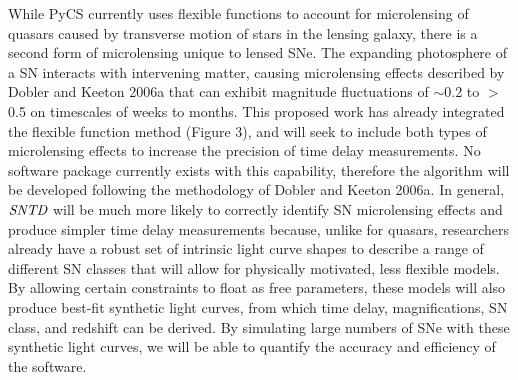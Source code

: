 While PyCS currently uses flexible functions to account for microlensing of quasars caused by transverse motion of stars in the lensing galaxy, there is a second form of microlensing unique to lensed SNe. The expanding photosphere of a SN interacts with intervening matter, causing microlensing effects described by Dobler and Keeton 2006a that can exhibit magnitude fluctuations of $\sim$0.2 to $>$0.5 on timescales of weeks to months. This proposed work has already integrated the flexible function method (Figure 3), and will seek to include both types of microlensing effects to increase the precision of time delay measurements. No software package currently exists with this capability, therefore the algorithm will be developed following the methodology of Dobler and Keeton 2006a. In general, $\textit{SNTD}$ will be much more likely to correctly identify SN microlensing effects and produce simpler time delay measurements because, unlike for quasars, researchers already have a robust set of intrinsic light curve shapes to describe a range of different SN classes that will allow for physically motivated, less flexible models. By allowing certain constraints to float as free parameters, these models will also produce best-fit synthetic light curves, from which time delay, magnifications, SN class, and redshift can be derived. By simulating large numbers of SNe with these synthetic light curves, we will be able to quantify the accuracy and efficiency of the software.






